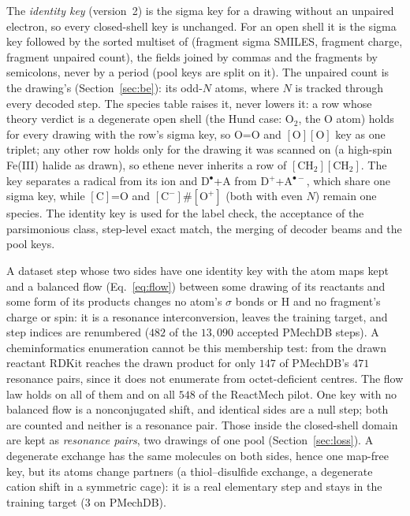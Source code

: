 \documentclass[11pt,a4paper]{article}
\begin{document}
The \emph{identity key} (version~2) is the sigma key for a drawing without an unpaired electron, so every closed-shell key is unchanged. For an open shell it is the sigma key followed by the sorted multiset of (fragment sigma SMILES, fragment charge, fragment unpaired count), the fields joined by commas and the fragments by semicolons, never by a period (pool keys are split on it). The unpaired count is the drawing's (Section~\ref{sec:be}): its odd-$N$ atoms, where $N$ is tracked through every decoded step. The species table raises it, never lowers it: a row whose theory verdict is a degenerate open shell (the Hund case: O$_2$, the O atom) holds for every drawing with the row's sigma key, so O=O and $[\mathrm O][\mathrm O]$ key as one triplet; any other row holds only for the drawing it was scanned on (a high-spin Fe(III) halide as drawn), so ethene never inherits a row of $[\mathrm{CH_2}][\mathrm{CH_2}]$. The key separates a radical from its ion and D$^\bullet$+A from D$^+$+A$^{\bullet-}$, which share one sigma key, while $[\mathrm C]$=O and $[\mathrm C^-]\#[\mathrm O^+]$ (both with even $N$) remain one species. The identity key is used for the label check, the acceptance of the parsimonious class, step-level exact match, the merging of decoder beams and the pool keys.

A dataset step whose two sides have one identity key with the atom maps kept and a balanced flow (Eq.~\eqref{eq:flow}) between some drawing of its reactants and some form of its products changes no atom's $\sigma$ bonds or H and no fragment's charge or spin: it is a resonance interconversion, leaves the training target, and step indices are renumbered ($482$ of the $13{,}090$ accepted PMechDB steps). A cheminformatics enumeration cannot be this membership test: from the drawn reactant RDKit reaches the drawn product for only $147$ of PMechDB's $471$ resonance pairs, since it does not enumerate from octet-deficient centres. The flow law holds on all of them and on all $548$ of the ReactMech pilot. One key with no balanced flow is a nonconjugated shift, and identical sides are a null step; both are counted and neither is a resonance pair. Those inside the closed-shell domain are kept as \emph{resonance pairs}, two drawings of one pool (Section~\ref{sec:loss}). A degenerate exchange has the same molecules on both sides, hence one map-free key, but its atoms change partners (a thiol--disulfide exchange, a degenerate cation shift in a symmetric cage): it is a real elementary step and stays in the training target ($3$ on PMechDB).
\end{document}
